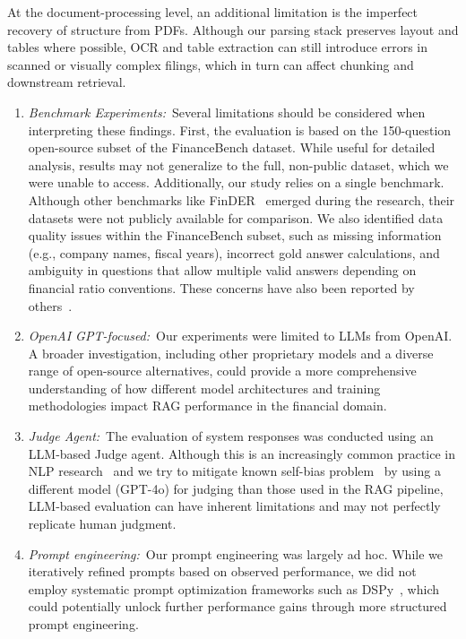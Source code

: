 \documentclass[final,5p,times,twopage,twocolumn,a4paper]{elsarticle}
\begin{document}
At the document-processing level, an additional limitation is the imperfect recovery of structure from PDFs. Although our parsing stack preserves layout and tables where possible, OCR and table extraction can still introduce errors in scanned or visually complex filings, which in turn can affect chunking and downstream retrieval.
%
\begin{enumerate}
    \item \textit{Benchmark Experiments:}~Several limitations should be considered when interpreting these findings. First, the evaluation is based on the 150-question open-source subset of the FinanceBench dataset. While useful for detailed analysis, results may not generalize to the full, non-public dataset, which we were unable to access. Additionally, our study relies on a single benchmark. Although other benchmarks like FinDER~\cite{choi2025finder} emerged during the research, their datasets were not publicly available for comparison. We also identified data quality issues within the FinanceBench subset, such as missing information (e.g., company names, fiscal years), incorrect gold answer calculations, and ambiguity in questions that allow multiple valid answers depending on financial ratio conventions. These concerns have also been reported by others~\cite{vectify2025mafingithub}.
    \item  \textit{OpenAI GPT-focused:}~Our experiments were limited to LLMs from OpenAI. A broader investigation, including other proprietary models and a diverse range of open-source alternatives, could provide a more comprehensive understanding of how different model architectures and training methodologies impact RAG performance in the financial domain.
    \item  \textit{Judge Agent:}~The evaluation of system responses was conducted using an LLM-based Judge agent. Although this is an increasingly common practice in NLP research~\cite{Zheng2023JudgingLWA,gu2024survey} and we try to mitigate known self-bias problem~\cite{Xu2024PrideAPA,ye2024justiceprejudicequantifyingbiases} by using a different model (GPT-4o) for judging than those used in the RAG pipeline, LLM-based evaluation can have inherent limitations and may not perfectly replicate human judgment.
    \item  \textit{Prompt engineering:}~Our prompt engineering was largely ad hoc. While we iteratively refined prompts based on observed performance, we did not employ systematic prompt optimization frameworks such as DSPy~\cite{khattab2023dspy}, which could potentially unlock further performance gains through more structured prompt engineering.
\end{enumerate}
\end{document}
